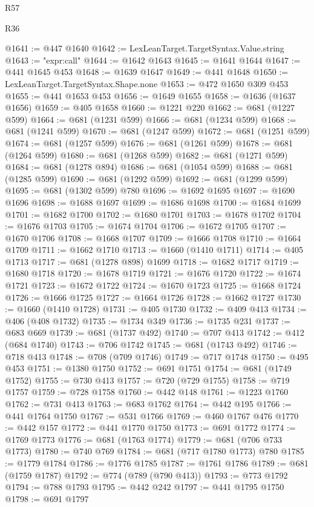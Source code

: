 \begin{lexlean}{R57}
\begin{lexlean}{R36}
\begin{coremodule}
{{{{{{{{{{{{{{{{{{{{{{{{{{{{{{{{{{{{{{{{{{{{{{{{{{{{{{{{{{{{{{{{{{{{{{{{{{{{{{{{{{@1641 := @447 @1640
@1642 := LexLeanTarget.TargetSyntax.Value.string
@1643 := "expr:call"
@1644 := @1642 @1643
@1645 := @1641 @1644
@1647 := @441 @1645 @453
@1648 := @1639 @1647
@1649 := @441 @1648
@1650 := LexLeanTarget.TargetSyntax.Shape.none
@1653 := @472 @1650 @309 @453
@1655 := @441 @1653 @453
@1656 := @1649 @1655
@1658 := @1636 (@1637 @1656)
@1659 := @405 @1658
@1660 := @1221 @220
@1662 := @681 (@1227 @599)
@1664 := @681 (@1231 @599)
@1666 := @681 (@1234 @599)
@1668 := @681 (@1241 @599)
@1670 := @681 (@1247 @599)
@1672 := @681 (@1251 @599)
@1674 := @681 (@1257 @599)
@1676 := @681 (@1261 @599)
@1678 := @681 (@1264 @599)
@1680 := @681 (@1268 @599)
@1682 := @681 (@1271 @599)
@1684 := @681 (@1278 @894)
@1686 := @681 (@1054 @599)
@1688 := @681 (@1285 @599)
@1690 := @681 (@1292 @599)
@1692 := @681 (@1299 @599)
@1695 := @681 (@1302 @599) @780
@1696 := @1692 @1695
@1697 := @1690 @1696
@1698 := @1688 @1697
@1699 := @1686 @1698
@1700 := @1684 @1699
@1701 := @1682 @1700
@1702 := @1680 @1701
@1703 := @1678 @1702
@1704 := @1676 @1703
@1705 := @1674 @1704
@1706 := @1672 @1705
@1707 := @1670 @1706
@1708 := @1668 @1707
@1709 := @1666 @1708
@1710 := @1664 @1709
@1711 := @1662 @1710
@1713 := @1660 (@1410 @1711)
@1714 := @405 @1713
@1717 := @681 (@1278 @898) @1699
@1718 := @1682 @1717
@1719 := @1680 @1718
@1720 := @1678 @1719
@1721 := @1676 @1720
@1722 := @1674 @1721
@1723 := @1672 @1722
@1724 := @1670 @1723
@1725 := @1668 @1724
@1726 := @1666 @1725
@1727 := @1664 @1726
@1728 := @1662 @1727
@1730 := @1660 (@1410 @1728)
@1731 := @405 @1730
@1732 := @409 @413
@1734 := @406 (@408 @1732)
@1735 := @1734 @349
@1736 := @1735 @231
@1737 := @683 @669
@1739 := @681 (@1737 @492)
@1740 := @707 @413
@1742 := @412 (@684 @1740)
@1743 := @706 @1742
@1745 := @681 (@1743 @492)
@1746 := @718 @413
@1748 := @708 (@709 @1746)
@1749 := @717 @1748
@1750 := @495 @453
@1751 := @1380 @1750
@1752 := @691 @1751
@1754 := @681 (@1749 @1752)
@1755 := @730 @413
@1757 := @720 (@729 @1755)
@1758 := @719 @1757
@1759 := @728 @1758
@1760 := @442 @148
@1761 := @1223 @1760
@1762 := @731 @413
@1763 := @683 @1762
@1764 := @442 @195
@1766 := @441 @1764 @1750
@1767 := @531 @1766
@1769 := @460 @1767 @476
@1770 := @442 @157
@1772 := @441 @1770 @1750
@1773 := @691 @1772
@1774 := @1769 @1773
@1776 := @681 (@1763 @1774)
@1779 := @681 (@706 @733 @1773)
@1780 := @740 @769
@1784 := @681 (@717 @1780 @1773) @780
@1785 := @1779 @1784
@1786 := @1776 @1785
@1787 := @1761 @1786
@1789 := @681 (@1759 @1787)
@1792 := @774 (@789 (@790 @413))
@1793 := @773 @1792
@1794 := @788 @1793
@1795 := @442 @242
@1797 := @441 @1795 @1750
@1798 := @691 @1797
}}}}}}}}}}}}}}}}}}}}}}}}}}}}}}}}}}}}}}}}}}}}}}}}}}}}}}}}}}}}}}}}}}}}}}}}}}}}}}}}}}
\end{coremodule}
\end{lexlean}
\end{lexlean}

